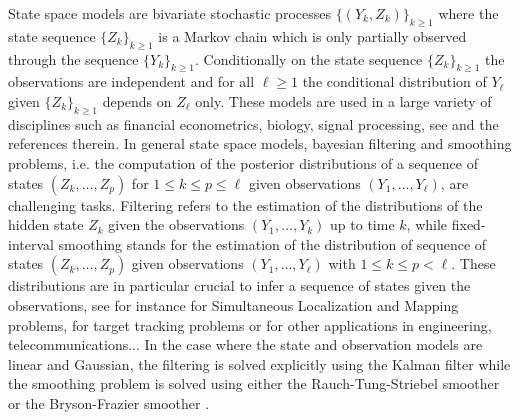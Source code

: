 %


State space models are bivariate stochastic processes $\{(Y_k,Z_k)\}_{k\ge 1}$ where the state sequence $\{Z_k\}_{k\ge 1}$ is a Markov chain which is only partially observed through the sequence $\{Y_k\}_{k\ge 1}$. Conditionally on the state sequence $\{Z_k\}_{k\ge 1}$ the observations are independent and for all $\ell\ge 1$ the conditional distribution of $Y_{\ell}$ given $\{Z_k\}_{k\ge 1}$ depends on $Z_{\ell}$ only. These models are used in a large variety of disciplines such as financial econometrics, biology, signal processing, see \cite{delmoral:2013} and the references therein. In general state space models, bayesian filtering and smoothing problems, i.e. the computation of the posterior distributions of a sequence of states $(Z_{k},\ldots,Z_{p})$ for $1\le k\le p\le \ell$ given observations $(Y_{1},\ldots,Y_{\ell})$, are challenging tasks. Filtering refers to the estimation of the distributions of the hidden state $Z_k$ given the observations $(Y_1,\ldots,Y_k)$ up to time $k$, while fixed-interval smoothing stands for the estimation of the distribution of sequence of states $(Z_{k},\ldots,Z_{p})$ given observations $(Y_{1},\ldots,Y_{\ell})$ with $1\le k\le p<\ell$. These distributions are in particular crucial to infer a sequence of states given the observations, see for instance \cite{thrun:burgard:fox:2005} for Simultaneous Localization and Mapping problems, \cite{barshalom:li:kirubarjan:2001} for target tracking problems or \cite{sarkka:2013,douc:moulines:stoffer:2013} for other applications in engineering, telecommunications... In the case where the state and observation models are linear and Gaussian, the filtering is solved explicitly using the Kalman filter \cite{kalman:1960} while the smoothing problem is solved using either the Rauch-Tung-Striebel smoother \cite{rauch:striebel:tung:1965} or the Bryson-Frazier smoother \cite{bryson:frazier:1963}. %
